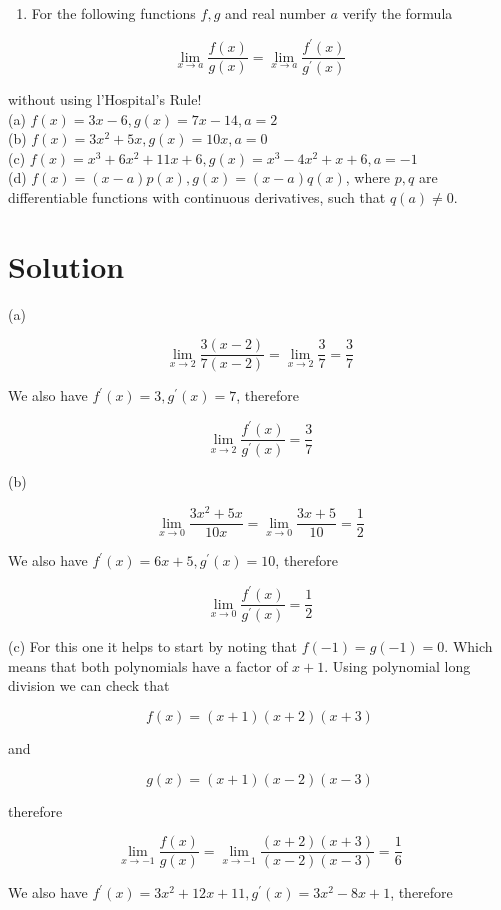 \documentclass[10pt]{article}
\begin{document}
\begin{enumerate}
  \item For the following functions $f, g$ and real number $a$ verify the formula
\end{enumerate}

$$
\lim _{x \rightarrow a} \frac{f(x)}{g(x)}=\lim _{x \rightarrow a} \frac{f^{\prime}(x)}{g^{\prime}(x)}
$$

without using l'Hospital's Rule!\\
(a) $f(x)=3 x-6, g(x)=7 x-14, a=2$\\
(b) $f(x)=3 x^{2}+5 x, g(x)=10 x, a=0$\\
(c) $f(x)=x^{3}+6 x^{2}+11 x+6, g(x)=x^{3}-4 x^{2}+x+6, a=-1$\\
(d) $f(x)=(x-a) p(x), g(x)=(x-a) q(x)$, where $p, q$ are differentiable functions with continuous derivatives, such that $q(a) \neq 0$.

\section*{Solution}
(a)

$$
\lim _{x \rightarrow 2} \frac{3(x-2)}{7(x-2)}=\lim _{x \rightarrow 2} \frac{3}{7}=\frac{3}{7}
$$

We also have $f^{\prime}(x)=3, g^{\prime}(x)=7$, therefore

$$
\lim _{x \rightarrow 2} \frac{f^{\prime}(x)}{g^{\prime}(x)}=\frac{3}{7}
$$

(b)

$$
\lim _{x \rightarrow 0} \frac{3 x^{2}+5 x}{10 x}=\lim _{x \rightarrow 0} \frac{3 x+5}{10}=\frac{1}{2}
$$

We also have $f^{\prime}(x)=6 x+5, g^{\prime}(x)=10$, therefore

$$
\lim _{x \rightarrow 0} \frac{f^{\prime}(x)}{g^{\prime}(x)}=\frac{1}{2}
$$

(c) For this one it helps to start by noting that $f(-1)=g(-1)=0$. Which means that both polynomials have a factor of $x+1$. Using polynomial long division we can check that

$$
f(x)=(x+1)(x+2)(x+3)
$$

and

$$
g(x)=(x+1)(x-2)(x-3)
$$

therefore

$$
\lim _{x \rightarrow-1} \frac{f(x)}{g(x)}=\lim _{x \rightarrow-1} \frac{(x+2)(x+3)}{(x-2)(x-3)}=\frac{1}{6}
$$

We also have $f^{\prime}(x)=3 x^{2}+12 x+11, g^{\prime}(x)=3 x^{2}-8 x+1$, therefore
\end{document}
